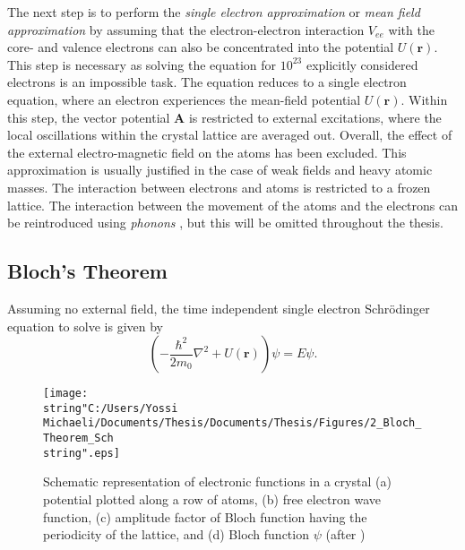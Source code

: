 The next step is to perform the \emph{single electron approximation}
or \emph{mean field approximation} by assuming that the electron-electron
interaction $V_{ee}$ with the core- and valence electrons can also
be concentrated into the potential $U(\mathbf{r})$. This step is
necessary as solving the equation for $10^{23}$ explicitly considered
electrons is an impossible task. The equation reduces to a single
electron equation, where an electron experiences the mean-field potential
$U(\mathbf{r})$. Within this step, the vector potential $\mathbf{A}$
is restricted to external excitations, where the local oscillations
within the crystal lattice are averaged out. Overall, the effect of
the external electro-magnetic field on the atoms has been excluded.
This approximation is usually justified in the case of weak fields
and heavy atomic masses. The interaction between electrons and atoms
is restricted to a frozen lattice. The interaction between the movement
of the atoms and the electrons can be reintroduced using \emph{phonons}
\citet{Yu2005}, but this will be omitted throughout the thesis.


\subsection{Bloch's Theorem}

Assuming no external field, the time independent single electron Schr\"{o}dinger 
equation to solve is given by\begin{equation}
\left(-\frac{\hbar^{2}}{2m_{0}}\nabla^{2}+U(\mathbf{r})\right)\psi=E\psi.\end{equation}
%
\begin{figure}
\begin{centering}
\texttt{[image: \\string"C:/Users/Yossi Michaeli/Documents/Thesis/Documents/Thesis/Figures/2\_Bloch\_Theorem\_Sch\\string".eps]}
\par\end{centering}

\caption{\label{fig:Bloch_Theorem_Sch}Schematic representation of electronic
functions in a crystal (a) potential plotted along a row of atoms,
(b) free electron wave function, (c) amplitude factor of Bloch function
having the periodicity of the lattice, and (d) Bloch function $\psi$
(after \citet{Piprek2003})}



\end{figure}


